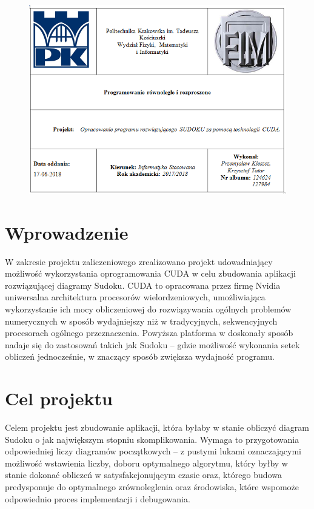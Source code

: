 \documentclass[a4paper,12pt]{article}
\begin{document}
\begin{figure}[ht]
	\centering
  \includegraphics[width=1.0\textwidth]{p1.png}
\end{figure}
\newpage

\tableofcontents
\newpage

\section{Wprowadzenie}

W zakresie projektu zaliczeniowego zrealizowano projekt udowadniający możliwość wykorzystania oprogramowania CUDA w celu zbudowania aplikacji rozwiązującej diagramy Sudoku. CUDA to opracowana przez firmę Nvidia uniwersalna architektura procesorów wielordzeniowych, umożliwiająca wykorzystanie ich mocy obliczeniowej do rozwiązywania ogólnych problemów numerycznych w sposób wydajniejszy niż w tradycyjnych, sekwencyjnych procesorach ogólnego przeznaczenia. Powyższa platforma w doskonały sposób nadaje się do zastosowań takich jak Sudoku – gdzie możliwość wykonania setek obliczeń jednocześnie, w znaczący sposób zwiększa wydajność programu.

\section{Cel projektu}
Celem projektu jest zbudowanie aplikacji, która byłaby w stanie obliczyć diagram Sudoku o jak największym stopniu skomplikowania. Wymaga to przygotowania odpowiedniej liczy diagramów początkowych – z pustymi lukami oznaczającymi możliwość wstawienia liczby, doboru optymalnego algorytmu, który byłby w stanie dokonać obliczeń w satysfakcjonującym czasie oraz, którego budowa predysponuje do optymalnego zrównoleglenia oraz środowiska, które wspomoże odpowiednio proces implementacji i debugowania. 
\end{document}
